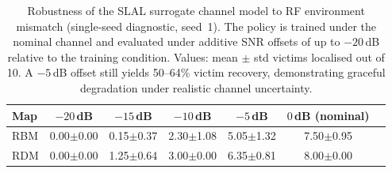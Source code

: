 \begin{table}[t]
\centering
\caption{Robustness of the SLAL surrogate channel model to RF environment mismatch
(single-seed diagnostic, seed~1). The policy is trained under the nominal channel and
evaluated under additive SNR offsets of up to $-20$\,dB relative to the training
condition. Values: mean $\pm$ std victims localised out of 10.
A $-5$\,dB offset still yields 50--64\% victim recovery, demonstrating graceful
degradation under realistic channel uncertainty.}
\label{tab:channel_shift}
\small
\begin{tabular}{lcccccc}
\toprule
Map & $-20$\,dB & $-15$\,dB & $-10$\,dB & $-5$\,dB & $0$\,dB (nominal) \\
\midrule
RBM & 0.00$\pm$0.00 & 0.15$\pm$0.37 & 2.30$\pm$1.08 & 5.05$\pm$1.32 & 7.50$\pm$0.95 \\
RDM & 0.00$\pm$0.00 & 1.25$\pm$0.64 & 3.00$\pm$0.00 & 6.35$\pm$0.81 & 8.00$\pm$0.00 \\
\bottomrule
\end{tabular}
\end{table}
